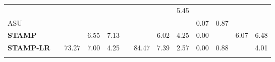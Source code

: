 \begin{table}[htbp]
{\begin{tabularx}{\textwidth}{l|*{4}{>{\centering\arraybackslash}X}|*{4}{>{\centering\arraybackslash}X}|*{4}{>{\centering\arraybackslash}X}}
  & 2.10 & 70.17 & 11.99 & 11.20
  & 2.47 & 78.30 & 10.90 & {5.45}
  & 0.45 & 0.85  &  9.93 & 9.24\\
\rowcolor{gray!15}
ASU~\cite{zade2026attention}
  & 0.90 & 68.39 &  7.91 & 12.13
  & 0.10 & 79.93 &  7.17 & 6.36
  & {0.07} & \colorbox{yellow!40}{0.87}  &  8.18 & 10.57\\
\midrule\midrule
\textbf{STAMP}
  & 0.00 & 70.13 &  \colorbox{green!30}{6.55} & \colorbox{yellow!40}{7.13}
  & 0.00 & 80.13 &  \colorbox{green!30}{6.02} & \colorbox{yellow!40}{4.25}
  & {0.00}  & 0.79  &  \colorbox{green!30}{6.07} & \colorbox{yellow!40}{6.48} \\
\textbf{STAMP-LR}
  & 0.00 & {73.27} & \colorbox{yellow!40}{7.00} & \colorbox{green!30}{4.25}
  & 0.00 & \colorbox{green!30}{84.47} & {7.39} & \colorbox{green!30}{2.57}
  & {0.00}  & \colorbox{green!30}{0.88} & 8.17 & \colorbox{green!30}{4.01} \\
\Xhline{1.15pt}
\end{tabularx}%
}
\end{table}